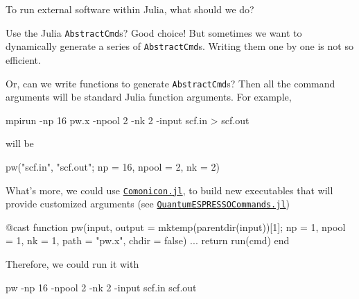 \begin{frame}{\subsubsecname}

    To run external \ab{} software within Julia, what should we do?

    Use the Julia \texttt{AbstractCmd}s? Good choice! But sometimes we want to dynamically generate
    a series of \texttt{AbstractCmd}s. Writing them one by one is not so efficient.

    Or, can we write functions to generate \texttt{AbstractCmd}s? Then all the command
    arguments will be standard Julia function arguments. For example,

    {\scriptsize
            \begin{algorithmblock}
                mpirun -np 16 pw.x -npool 2 -nk 2 -input scf.in > scf.out
            \end{algorithmblock}
        }

    will be

        {\scriptsize
            \begin{algorithmblock}
                \begin{juliaverbatim}
pw("scf.in", "scf.out"; np = 16, npool = 2, nk = 2)
                \end{juliaverbatim}
            \end{algorithmblock}
        }

    \framebreak

    What's more, we could use
    \href{https://github.com/comonicon/Comonicon.jl}{\texttt{Comonicon.jl}},
    to build new executables that will provide customized arguments
    (see \href{https://github.com/MineralsCloud/QuantumESPRESSOCommands.jl}{\texttt{QuantumESPRESSOCommands.jl}})

    {\scriptsize
            \begin{algorithmblock}
                \begin{juliaverbatim}
@cast function pw(input, output = mktemp(parentdir(input))[1]; 
                  np = 1, npool = 1, nk = 1, path = "pw.x", chdir = false)
    ...
    return run(cmd)
end
                \end{juliaverbatim}
            \end{algorithmblock}
        }

    Therefore, we could run it with

        {\scriptsize
            \begin{algorithmblock}
                pw -np 16 -npool 2 -nk 2 -input scf.in scf.out
            \end{algorithmblock}
        }

\end{frame}
